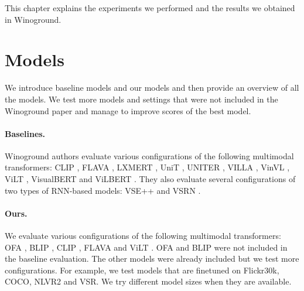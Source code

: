 This chapter explains the experiments we performed and the results we obtained in Winoground.

\section{Models} \label{sec:winoground_models}

We introduce baseline models and our models and then provide an overview of all the models. We test more models and settings that were not included in the Winoground paper and manage to improve scores of the best model.

\paragraph{Baselines.}
Winoground authors \cite{thrush2022winoground} evaluate various configurations of the following multimodal transformers: CLIP \cite{radford2021clip}, FLAVA \cite{singh2022flava}, LXMERT \cite{tan2020lxmert}, UniT \cite{hu2021unit}, UNITER \cite{chen2020uniter}, VILLA \cite{gan2020villa}, VinVL \cite{zhang2021vinvl}, ViLT \cite{kim2021vilt}, VisualBERT \cite{li2019visualbert} and ViLBERT \cite{lu2019vilbert}. They also evaluate several configurations of two types of RNN-based models: VSE++ \cite{faghri2018vse} and VSRN \cite{li2019vsrn}.

\paragraph{Ours.}
We evaluate various configurations of the following multimodal transformers: OFA \cite{wang2022unifying}, BLIP \cite{li2022blip}, CLIP \cite{radford2021clip}, FLAVA \cite{singh2022flava} and ViLT \cite{kim2021vilt}. OFA and BLIP were not included in the baseline evaluation. The other models were already included but we test more configurations. For example, we test models that are finetuned on Flickr30k, COCO, NLVR2 and VSR. We try different model sizes when they are available.

